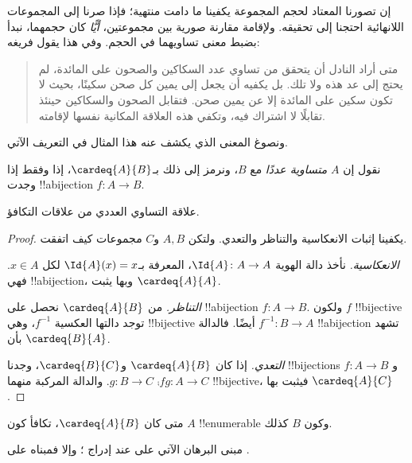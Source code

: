 \documentclass[../../../include/open-logic-section]{subfiles}
\begin{document}


إن تصورنا المعتاد لحجم المجموعة يكفينا ما دامت منتهية؛ فإذا صرنا إلى المجموعات اللانهائية احتجنا إلى تحقيقه. ولإقامة مقارنة صورية بين مجموعتين، \emph{أيًّا} كان حجمهما، نبدأ بضبط معنى تساويهما في الحجم. وفي هذا يقول فريغه:
\begin{quote}
متى أراد النادل أن يتحقق من تساوي عدد السكاكين والصحون على المائدة، لم يحتج إلى عد هذه ولا تلك. بل يكفيه أن يجعل إلى يمين كل صحن سكينًا، بحيث لا تكون سكين على المائدة إلا عن يمين صحن. فتقابل الصحون والسكاكين حينئذ تقابلًا لا اشتراك فيه، وتكفي هذه العلاقة المكانية نفسها لإقامته. \citep[\S70]{Frege1884}
\end{quote}
ونصوغ المعنى الذي يكشف عنه هذا المثال في التعريف الآتي.

\begin{defn}
نقول إن $A$ \emph{متساوية عددًا} مع $B$، ونرمز إلى ذلك بـ$\cardeq{A}{B}$، إذا وفقط إذا وجدت !!a{bijection} $f \colon A \to B$.
\end{defn}

\begin{prop}
علاقة التساوي العددي من علاقات التكافؤ.
\end{prop}

\begin{proof}
يكفينا إثبات الانعكاسية والتناظر والتعدي. ولتكن $A, B$ و$C$ مجموعات كيف اتفقت.

\emph{الانعكاسية.} نأخذ دالة الهوية $\Id{A} \colon A \to A$، المعرفة بـ$\Id{A} (x) = x$ لكل $x \in A$. فهي !!a{bijection}، وبها يثبت $\cardeq{A}{A}$.

\emph{التناظر.} من $\cardeq{A}{B}$ نحصل على !!a{bijection} $f\colon A \to B$. ولكون $f$ !!{bijective} توجد دالتها العكسية $f^{-1}$، وهي !!{bijective} أيضًا. فالدالة $f^{-1}\colon B \to A$ !!a{bijection} تشهد بأن $\cardeq{B}{A}$.

\emph{التعدي.} إذا كان $\cardeq{A}{B}$ و$\cardeq{B}{C}$، وجدنا !!{bijection}s $f\colon A \to B$ و$g\colon B \to
C$. والدالة المركبة منهما $\comp{f}{g}\colon A \to C$ !!{bijective}، فيثبت بها $\cardeq{A}{C}$.
\end{proof}

\begin{prop}
متى كان $\cardeq{A}{B}$، تكافأ كون $A$ !!{enumerable} وكون $B$ كذلك.
\end{prop}

\begin{editorial}
مبنى البرهان الآتي على  عند إدراج ؛ وإلا فمبناه على .
\end{editorial}
\end{document}
